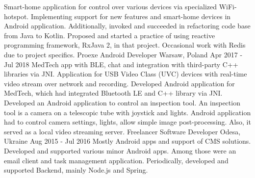   {
    Smart-home application for control over various devices via specialized WiFi-hotspot.
    Implementing support for new features and smart-home devices in Android application.
    Additionally, invoked and succeeded in refactoring code base from Java to Kotlin.
    \newline
    Proposed and started a practice of using reactive programming framework, RxJava 2, in that project.
    Occasional work with Redis due to project specifics.
  }
\cvexperience
  {Proexe}
  {Android Developer}
  {Warsaw, Poland}
  {Apr 2017 - Jul 2018}
  {
    MedTech app with BLE, chat and integration with third-party C++ libraries via JNI.
    \newline
    Application for USB Video Class (UVC) devices with real-time video stream over network and recording.
  }
  {
    Developed Android application for MedTech, which had integrated Bluetooth LE and C++ library via JNI.
    \newline
    Developed an Android application to control an inspection tool.
    An inspection tool is a camera on a telescopic tube with joystick and lights.
    Android application had to control camera settings, lights, allow simple image post-processing.
    Also, it served as a local video streaming server.
  }
\cvexperience
  {Freelancer}
  {Software Developer}
  {Odesa, Ukraine}
  {Aug 2015 - Jul 2016}
  {
    Mostly Android apps and support of CMS solutions.
  }
  {
    Developed and supported various minor Android apps. Among those were an email client and task management application.
    \newline
    Periodically, developed and supported Backend, mainly Node.js and Spring.
  }

